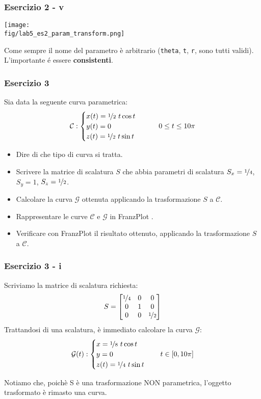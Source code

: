 \documentclass{beamer}
\newcommand{\fig}{figures} %
\newcommand{\frnzplt}{FranzPlot }
\begin{document}
\begin{frame}
\frametitle{Esercizio 2 - v}
\begin{center}
\texttt{[image: \\fig/lab5\_es2\_param\_transform.png]}
\end{center}

    Come sempre il nome del parametro \`e arbitrario (\texttt{theta}, \texttt{t}, \texttt{r}, sono tutti validi).
    L'importante \'e essere \textbf{consistenti}.
\end{frame}
%
\begin{frame}
\frametitle{Esercizio 3}
    Sia data la seguente curva parametrica:
	\begin{displaymath}
	\mathcal{C}:\begin{cases}
	x(t)=  \nicefrac{1}{2} \ t \cos t\\
	y(t)= 0 \\
        z(t)= \nicefrac{1}{2} \ t \sin t
	\end{cases}
	\qquad 0 \leq t \leq 10 \pi
	\end{displaymath}
    \begin{itemize}
        \item Dire di che tipo di curva si tratta.
        \item Scrivere la matrice di scalatura $S$ che abbia parametri di scalatura $S_x = \nicefrac{1}{4}$, $S_y = 1$, $S_z = \nicefrac{1}{2}$.
        \item Calcolare la curva $\mathcal{G}$ ottenuta applicando la trasformazione $S$ a $\mathcal{C}$.
        \item Rappresentare le curve $\mathcal{C}$ e $\mathcal{G}$ in \frnzplt.
        \item Verificare con \frnzplt il risultato ottenuto, applicando la trasformazione $S$ a $\mathcal{C}$.
    \end{itemize}
\end{frame}

\begin{frame}
\frametitle{Esercizio 3 - i}
Scriviamo la matrice di scalatura richiesta:
\begin{equation}
S = 
\begin{bmatrix}
    \nicefrac{1}{4} &       0 & 0\\
    0  & 1 & 0\\ 
    0 & 0 & \nicefrac{1}{2} 
\end{bmatrix}
\end{equation}
    Trattandosi di una scalatura, \`e immediato calcolare la curva $\mathcal{G}$:
\begin{displaymath}
    \mathcal{G}(t):
\begin{cases}
    x = \nicefrac{1}{8} \ t \cos t \\
    y = 0 \\
    z(t)= \nicefrac{1}{4} \ t \sin t
\end{cases}
\quad
    t \in [0, 10 \pi]
\end{displaymath}

Notiamo che, poich\`e S \`e una trasformazione NON parametrica,
l'oggetto trasformato \`e rimasto una curva.
\end{frame}
\end{document}
